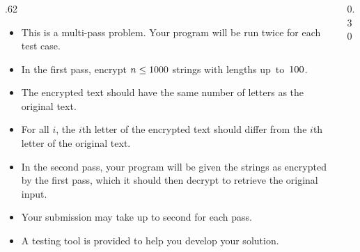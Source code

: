 \begin{frame}
    \frametitle{\problemtitle}

    \begin{columns}
        \begin{column}[T]{.62\textwidth}
            \begin{itemize}
                \item This is a multi-pass problem.
                    Your program will be run twice for each test case.
                \item
                    In the first pass, encrypt $n \leq 1000$ strings with lengths up~to~$100$.
                \item The encrypted text should have the same number of letters as the original text.
                \item For all $i$, the $i$th letter of the encrypted text should differ from the $i$th letter of the original text.
                \item
                    In the second pass, your program will be given the strings as encrypted by
                    the first pass, which it should then decrypt to retrieve the original input.
                \item
                    Your submission may take up to \timelimit{} second for each pass.
                \item A testing tool is provided to help you develop your solution.
            \end{itemize}



        \end{column}

        \begin{column}[T]{0.30\textwidth}
            \begin{columns}
            \end{columns}


\end{column}
\end{columns}
\end{frame}

